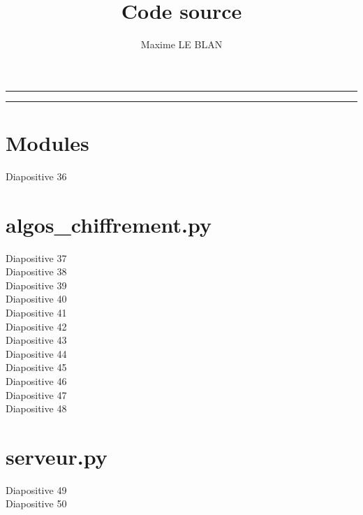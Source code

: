 \documentclass[french]{article}
\title{Code source}
\author{Maxime LE BLAN}
\date{}
\makeatletter
\def\maketitle{%
    \begin{center}\leavevmode
        \normalfont
        \rule[0pt]{\textwidth}{1pt}\par
        {\LARGE \@title\par}%
        {\small \@author\par}%
        {\Large \@date\par}%
        \rule[0pt]{\textwidth}{1pt}\par
    \end{center}%
}
\makeatother
\begin{document}
\maketitle
\tableofcontents
\newpage

\section{Modules}

Diapositive 36

\section{algos\_chiffrement.py}

Diapositive 37 \\


Diapositive 38 \\


Diapositive 39 \\


Diapositive 40 \\


Diapositive 41 \\


Diapositive 42 \\


Diapositive 43 \\


Diapositive 44 \\


Diapositive 45 \\


Diapositive 46 \\


Diapositive 47 \\


Diapositive 48

\section{serveur.py}

Diapositive 49 \\


Diapositive 50 \\
\end{document}
